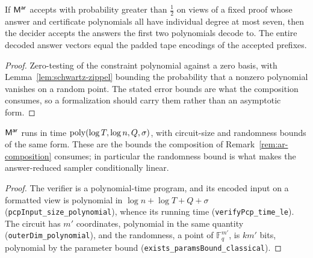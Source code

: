 \effortHard

\begin{lemma}
\label{lem:pcp-soundness}
\leanok
If $\mathsf{M}^{\mathsf{ar}}$ accepts with probability greater than $\tfrac12$ on views of a fixed
proof whose answer and certificate polynomials all have individual degree at most seven,
then the decider accepts the answers the first two polynomials decode to. The entire
decoded answer vectors equal the padded tape encodings of the accepted prefixes.
\end{lemma}

\begin{proof}
\leanok
{}
Zero-testing of the constraint polynomial against a zero basis, with
Lemma~\ref{lem:schwartz-zippel} bounding the probability that a nonzero polynomial vanishes
on a random point. The stated error bounds are what the composition consumes, so a
formalization should carry them rather than an asymptotic form.
\end{proof}

\effortMedium

\begin{lemma}
\label{lem:pcp-complexity}
\leanok
$\mathsf{M}^{\mathsf{ar}}$ runs in time $\mathrm{poly}(\log T, \log n, Q, \sigma)$, with circuit-size and
randomness bounds of the same form. These are the bounds the composition of
Remark~\ref{rem:ar-composition} consumes; in particular the randomness bound is what makes the
answer-reduced sampler conditionally linear.
\end{lemma}

\begin{proof}
\leanok
The verifier is a polynomial-time program, and its encoded input on a formatted view is
polynomial in $\log n+\log T+Q+\sigma$ (\texttt{pcpInput\_size\_polynomial}), whence its running
time (\texttt{verifyPcp\_time\_le}). The circuit has $m'$ coordinates, polynomial in the same
quantity (\texttt{outerDim\_polynomial}), and the randomness, a point of $\mathbb F_q^{m'}$, is
$km'$ bits, polynomial by the parameter bound (\texttt{exists\_paramsBound\_classical}).
\end{proof}

